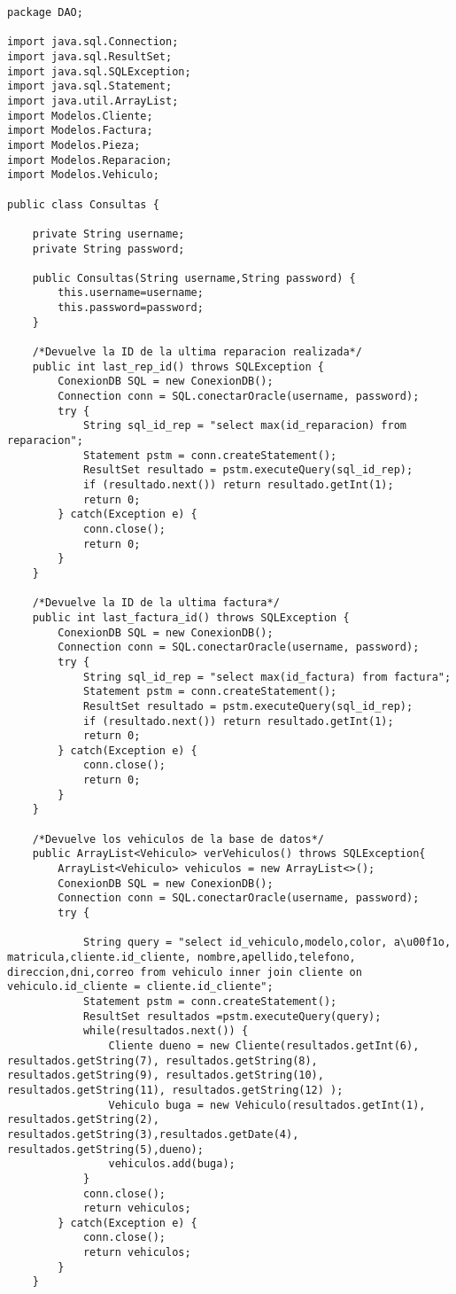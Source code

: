 \begin{lstlisting}[caption=Consultas.java (App Escritorio)]
package DAO;

import java.sql.Connection;
import java.sql.ResultSet;
import java.sql.SQLException;
import java.sql.Statement;
import java.util.ArrayList;
import Modelos.Cliente;
import Modelos.Factura;
import Modelos.Pieza;
import Modelos.Reparacion;
import Modelos.Vehiculo;

public class Consultas {
	
	private String username;
	private String password;
	
	public Consultas(String username,String password) {
		this.username=username;
		this.password=password;
	}
	
	/*Devuelve la ID de la ultima reparacion realizada*/
	public int last_rep_id() throws SQLException {
		ConexionDB SQL = new ConexionDB();
		Connection conn = SQL.conectarOracle(username, password);
		try {
			String sql_id_rep = "select max(id_reparacion) from reparacion";
			Statement pstm = conn.createStatement();
			ResultSet resultado = pstm.executeQuery(sql_id_rep);
			if (resultado.next()) return resultado.getInt(1);
			return 0;
		} catch(Exception e) {
			conn.close();
			return 0;
		}
	}
	
	/*Devuelve la ID de la ultima factura*/
	public int last_factura_id() throws SQLException {
		ConexionDB SQL = new ConexionDB();
		Connection conn = SQL.conectarOracle(username, password);
		try {
			String sql_id_rep = "select max(id_factura) from factura";
			Statement pstm = conn.createStatement();
			ResultSet resultado = pstm.executeQuery(sql_id_rep);
			if (resultado.next()) return resultado.getInt(1);
			return 0;
		} catch(Exception e) {
			conn.close();
			return 0;
		}
	}
	
	/*Devuelve los vehiculos de la base de datos*/
	public ArrayList<Vehiculo> verVehiculos() throws SQLException{
		ArrayList<Vehiculo> vehiculos = new ArrayList<>();
		ConexionDB SQL = new ConexionDB();
		Connection conn = SQL.conectarOracle(username, password);
		try {
			
			String query = "select id_vehiculo,modelo,color, a\u00f1o, matricula,cliente.id_cliente, nombre,apellido,telefono, direccion,dni,correo from vehiculo inner join cliente on vehiculo.id_cliente = cliente.id_cliente";
			Statement pstm = conn.createStatement();
			ResultSet resultados =pstm.executeQuery(query);
			while(resultados.next()) {
				Cliente dueno = new Cliente(resultados.getInt(6), resultados.getString(7), resultados.getString(8), resultados.getString(9), resultados.getString(10), resultados.getString(11), resultados.getString(12) );
				Vehiculo buga = new Vehiculo(resultados.getInt(1), resultados.getString(2), resultados.getString(3),resultados.getDate(4), resultados.getString(5),dueno);
				vehiculos.add(buga);
			}
			conn.close();
			return vehiculos;
		} catch(Exception e) {
			conn.close();
			return vehiculos;
		}
	}
	


\end{lstlisting}
